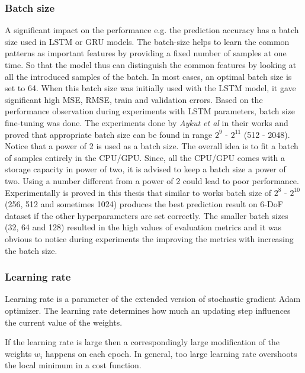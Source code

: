\subsubsection{Batch size}
\label{sec:eval:experiments:early:batch}
A significant impact on the performance e.g. the prediction accuracy has a batch size used in LSTM or GRU models. The batch-size helps to learn the common patterns as important features by providing a fixed number of samples at one time. So that the model thus can distinguish the common features by looking at all the introduced samples of the batch. In most cases, an optimal batch size is set to 64. When this batch size was initially used with the LSTM model, it gave significant high MSE, RMSE, train and validation errors. Based on the performance observation during experiments with LSTM parameters, batch size fine-tuning was done. The experiments done by \textit{Aykut et al} in their works \cite{delay_compensation_360} and \cite{telepresence} proved that appropriate batch size can be found in range $2^{9}$ - $2^{11}$ (512 - 2048). Notice that a power of 2 is used as a batch size. The overall idea is to fit a batch of samples entirely in the CPU/GPU. Since, all the CPU/GPU comes with a storage capacity in power of two, it is advised to keep a batch size a power of two. Using a number different from a power of 2 could lead to poor performance. Experimentally is proved in this thesis that similar to works \cite{delay_compensation_360, telepresence} batch size of $2^{8}$ - $2^{10}$ (256, 512 and sometimes 1024) produces the best prediction result on 6-DoF dataset if the other hyperparameters are set correctly. The smaller batch sizes (32, 64 and 128) resulted in the high values of evaluation metrics and it was obvious to notice during experiments the improving the metrics with increasing the batch size.

\subsubsection{Learning rate}
\label{sec:eval:experiments:early:lr}
Learning rate is a parameter of the extended version of stochastic gradient Adam optimizer. The learning rate determines how much an updating step influences the current value of the weights. 

If the learning rate is large then a correspondingly large modification of the weights $w_i$ happens on each epoch. In general, too large learning rate overshoots the local minimum in a cost function.

